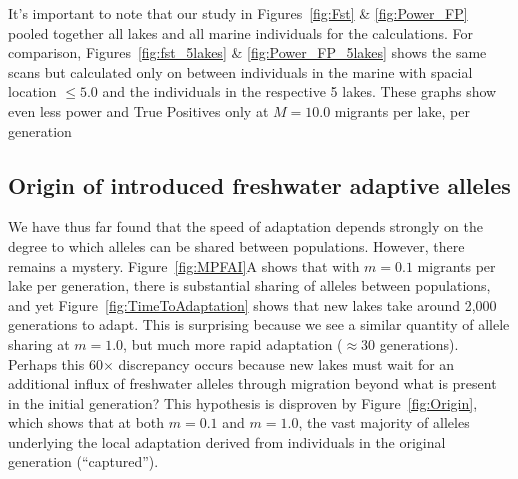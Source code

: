 \documentclass{article}
\begin{document}
It's important to note that our study in Figures~\ref{fig:Fst} \& \ref{fig:Power_FP} pooled together all lakes and all marine individuals for the calculations. 
For comparison, Figures~\ref{fig:fst_5lakes} \& \ref{fig:Power_FP_5lakes} shows the same scans but calculated 
only on between individuals in the marine with spacial location $\le 5.0$ and the individuals in the respective 5 lakes.
These graphs show even less power and True Positives only at $ M = 10.0$ migrants per lake, per generation



\subsection*{Origin of introduced freshwater adaptive alleles}

We have thus far found that the speed of adaptation depends strongly
on the degree to which alleles can be shared between populations.
However, there remains a mystery.
Figure~\ref{fig:MPFAI}A shows that with $m = 0.1$ migrants per lake per generation, 
there is substantial sharing of alleles between populations,
and yet Figure~\ref{fig:TimeToAdaptation} shows that new lakes 
take around 2,000 generations to adapt.
This is surprising because we see a similar quantity of allele sharing at  $m = 1.0$, 
but much more rapid adaptation ($\approx 30$ generations). 
Perhaps this 60$\times$ discrepancy occurs because 
new lakes must wait for an additional influx of freshwater alleles through migration
beyond what is present in the initial generation?
This hypothesis is disproven by
Figure~\ref{fig:Origin}, which shows that at both $m = 0.1$ and $m = 1.0$,
the vast majority of alleles underlying the local adaptation
derived from individuals in the original generation (``captured'').
\end{document}
